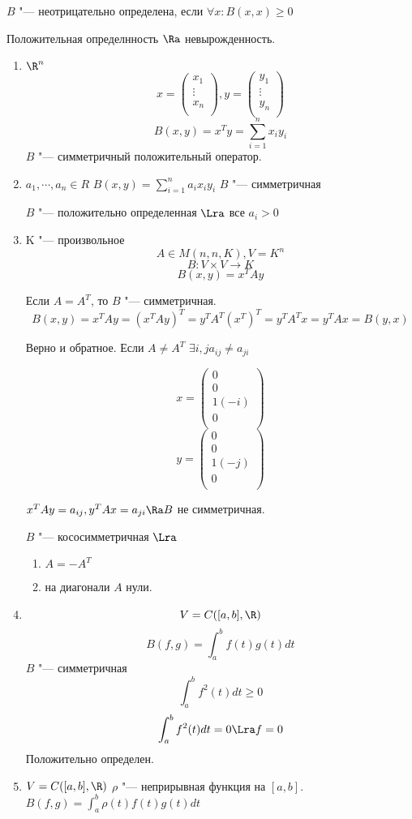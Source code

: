 \begin{Def}
$B$ "--- неотрицательно определена, если $\forall x \colon B(x, x) \ge 0$
\end{Def}
\begin{Rem}
Положительная определнность $\Ra$ невырожденность.
\end{Rem}
\begin{exmp}
\begin{enumerate}
\item $\R^n$
$$x = 
\begin{pmatrix}
x_1\\
\vdots\\
x_n\\
\end{pmatrix}, 
y = 
\begin{pmatrix}
y_1\\
\vdots\\
y_n\\
\end{pmatrix}$$
$$B(x, y) = x^{T}y = \sum_{i = 1}^{n}x_iy_i$$
$B$ "--- симметричный положительный оператор.
\item $a_1, \cdots, a_n \in R$
$B(x, y) = \sum_{i = 1}^{n}a_ix_iy_i$
$B$ "--- симметричная

$B$ "--- положительно определенная $\Lra$ все $a_i > 0$

\item K "--- произвольное 
$$A \in M(n, n, K), V = K^{n}$$
$$B \colon V \times V \to K$$
$$B(x, y) = x^{T}Ay$$

Если $A = A^{T}$, то $B$ "--- симметричная.
$$B(x, y) = x^TAy = (x^TAy)^T = y^TA^T(x^T)^T = y^TA^Tx = y^TAx = B(y, x)$$

Верно и обратное.
Если $A \ne A^{T}$
$\exists i, j a_{ij} \ne a_{ji}$

$$x = 
\begin{pmatrix}
0\\
0\\
1(-i)\\
0\\
\end{pmatrix}$$
$$y = 
\begin{pmatrix}
0\\
0\\
1(-j)\\
0\\
\end{pmatrix}$$

$x^{T}Ay = a_{ij}, y^TAx = a_{ji} \Ra B$ не симметричная.

$B$ "--- кососимметричная $\Lra$
\begin{enumerate}
\item $A = -A^{T}$
\item на диагонали $A$ нули. 
\end{enumerate}
\item
 $$V = C([a, b], \R)$$
 $$B(f, g) = \int_{a}^{b}f(t)g(t)dt$$
 $B$ "--- симметричная
 $$\int_{a}^{b}f^2(t)dt \ge 0$$
 $$\int_{a}^{b}f^2(t)dt = 0 \Lra f = 0$$
 Положительно определен.
\item $V = C([a, b], \R)$
$\rho$ "--- неприрывная функция на $[a, b]$.
$B(f, g) = \int_{a}^{b}\rho(t)f(t)g(t)dt$


\end{enumerate}
\end{exmp}
